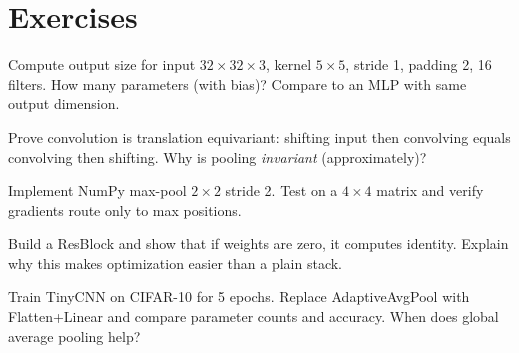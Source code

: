 \section{Exercises}
\begin{exercise} Compute output size for input $32\times32\times3$, kernel $5\times5$, stride 1, padding 2, 16 filters. How many parameters (with bias)? Compare to an MLP with same output dimension.\end{exercise}
\begin{exercise} Prove convolution is translation equivariant: shifting input then convolving equals convolving then shifting. Why is pooling \emph{invariant} (approximately)?\end{exercise}
\begin{exercise} Implement NumPy max-pool $2\times2$ stride 2. Test on a $4\times4$ matrix and verify gradients route only to max positions.\end{exercise}
\begin{exercise} Build a ResBlock and show that if weights are zero, it computes identity. Explain why this makes optimization easier than a plain stack.\end{exercise}
\begin{exercise} Train TinyCNN on CIFAR-10 for 5 epochs. Replace AdaptiveAvgPool with Flatten+Linear and compare parameter counts and accuracy. When does global average pooling help?\end{exercise}
